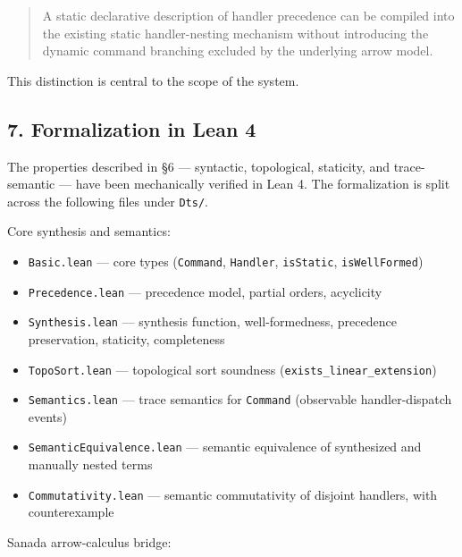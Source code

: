\documentclass[
  11pt,
]{article}
\providecommand{\tightlist}{%
  \setlength{\itemsep}{0pt}\setlength{\parskip}{0pt}}
\begin{document}
\begin{quote}
A static declarative description of handler precedence can be compiled
into the existing static handler-nesting mechanism without introducing
the dynamic command branching excluded by the underlying arrow model.
\end{quote}

This distinction is central to the scope of the system.

\subsection{7. Formalization in Lean 4}\label{formalization-in-lean-4}

The properties described in §6 --- syntactic, topological, staticity,
and trace-semantic --- have been mechanically verified in Lean 4. The
formalization is split across the following files under \texttt{Dts/}.

Core synthesis and semantics:

\begin{itemize}
\tightlist
\item
  \texttt{Basic.lean} --- core types (\texttt{Command},
  \texttt{Handler}, \texttt{isStatic}, \texttt{isWellFormed})
\item
  \texttt{Precedence.lean} --- precedence model, partial orders,
  acyclicity
\item
  \texttt{Synthesis.lean} --- synthesis function, well-formedness,
  precedence preservation, staticity, completeness
\item
  \texttt{TopoSort.lean} --- topological sort soundness
  (\texttt{exists\_linear\_extension})
\item
  \texttt{Semantics.lean} --- trace semantics for \texttt{Command}
  (observable handler-dispatch events)
\item
  \texttt{SemanticEquivalence.lean} --- semantic equivalence of
  synthesized and manually nested terms
\item
  \texttt{Commutativity.lean} --- semantic commutativity of disjoint
  handlers, with counterexample
\end{itemize}

Sanada arrow-calculus bridge:
\end{document}
